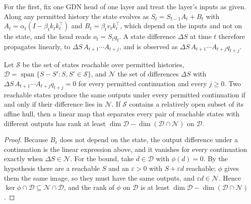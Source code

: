 For the first, fix one GDN head of one layer and treat the layer's inputs as given. Along any permitted history the state evolves as $S_t=S_{t-1}A_t+B_t$ with $A_t=\alpha_t(I-\beta_tk_tk_t^\top)$ and $B_t=\beta_tv_tk_t^\top$, which depend on the inputs and not on the state, and the head reads $o_t=S_tq_t$. A state difference $\Delta S$ at time $t$ therefore propagates linearly, to $\Delta S\,A_{t+1}\cdots A_{t+j}$, and is observed as $\Delta S\,A_{t+1}\cdots A_{t+j}q_{t+j}$.
\begin{proposition}\label{prop:minimal-state}
Let $\mathcal S$ be the set of states reachable over permitted histories, $\mathcal D=\operatorname{span}\{S-S':S,S'\in\mathcal S\}$, and $\mathcal N$ the set of differences $\Delta S$ with $\Delta S\,A_{t+1}\cdots A_{t+j}q_{t+j}=0$ for every permitted continuation and every $j\ge0$. Two reachable states produce the same outputs under every permitted continuation if and only if their difference lies in $\mathcal N$. If $\mathcal S$ contains a relatively open subset of its affine hull, then a linear map that separates every pair of reachable states with different outputs has rank at least $\dim\mathcal D-\dim(\mathcal D\cap\mathcal N)$ on $\mathcal D$.
\end{proposition}
\begin{proof}
Because $B_t$ does not depend on the state, the output difference under a continuation is the linear expression above, and it vanishes for every continuation exactly when $\Delta S\in\mathcal N$. For the bound, take $d\in\mathcal D$ with $\phi(d)=0$. By the hypothesis there are a reachable $S$ and an $\varepsilon>0$ with $S+\varepsilon d$ reachable; $\phi$ gives them the same image, so they must have the same outputs, and $\varepsilon d\in\mathcal N$. Hence $\ker\phi\cap\mathcal D\subseteq\mathcal N\cap\mathcal D$, and the rank of $\phi$ on $\mathcal D$ is at least $\dim\mathcal D-\dim(\mathcal D\cap\mathcal N)$.
\end{proof}
